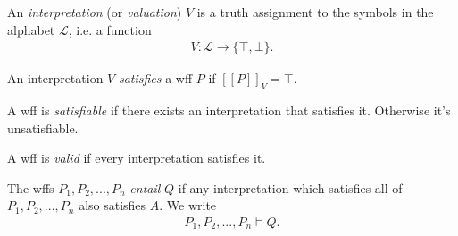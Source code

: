 \documentclass{article}
\begin{document}
\begin{definition}
    An \emph{interpretation} (or \emph{valuation}) $V$ is a truth assignment
    to the symbols in the alphabet $\mathcal{L}$, i.e. a function
    \begin{align*}
        V:\mathcal{L}\to \{\top,\bot\}.
    \end{align*}
\end{definition}

\begin{definition}
    An interpretation $V$ \emph{satisfies} a wff $P$ if $[\![ P]\!]_V=\top$.
\end{definition}

\begin{definition}
    A wff is \emph{satisfiable} if there exists an interpretation that satisfies it.
    Otherwise it's unsatisfiable.
\end{definition}

\begin{definition}
    A wff is \emph{valid} if every interpretation satisfies it.
\end{definition}

\begin{definition}
    The wffs $P_1, P_2,...,P_n$ \emph{entail} $Q$ if any interpretation
    which satisfies all of $P_1, P_2,...,P_n$ also satisfies $A$.
    We write 
    \begin{align*}
        P_1, P_2, ..., P_n \vDash Q.
    \end{align*}
\end{definition}
\end{document}
